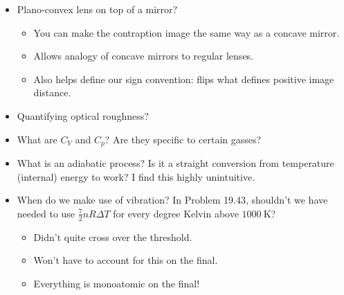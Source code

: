 \documentclass[../notes.tex]{subfiles}
\begin{document}
\begin{itemize}
\begin{itemize}
    \end{itemize}
    \item Plano-convex lens on top of a mirror?
    \begin{itemize}
        \item You can make the contraption image the same way as a concave mirror.
        \item Allows analogy of concave mirrors to regular lenses.
        \item Also helps define our sign convention: flips what defines positive image distance.
    \end{itemize}
    \item Quantifying optical roughness?
    \item What are $C_V$ and $C_p$? Are they specific to certain gasses?
    \item What is an adiabatic process? Is it a straight conversion from temperature (internal) energy to work? I find this highly unintuitive.
    \item When do we make use of vibration? In Problem 19.43, shouldn't we have needed to use $\frac{7}{2}nR\Delta T$ for every degree Kelvin above $\SI{1000}{\kelvin}$?
    \begin{itemize}
        \item Didn't quite cross over the threshold.
        \item Won't have to account for this on the final.
        \item Everything is monoatomic on the final!
    \end{itemize}
\end{itemize}
\end{document}
